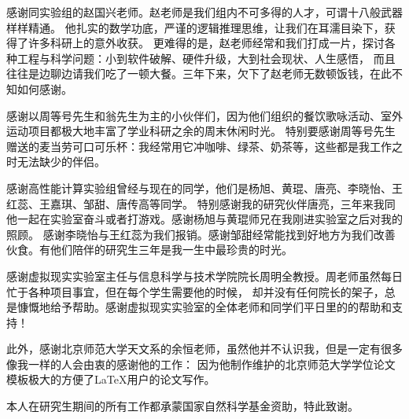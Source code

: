 \begin{ack}
感谢同实验组的赵国兴老师。赵老师是我们组内不可多得的人才，可谓十八般武器样样精通。 他扎实的数学功底，严谨的逻辑推理思维，让我们在耳濡目染下，获得了许多科研上的意外收获。 更难得的是，赵老师经常和我们打成一片，探讨各种工程与科学问题：小到软件破解、硬件升级，大到社会现状、人生感悟， 而且往往是边聊边请我们吃了一顿大餐。三年下来，欠下了赵老师无数顿饭钱，在此不知如何感谢。

感谢以周等号先生和翁先生为主的小伙伴们，因为他们组织的餐饮歌咏活动、室外运动项目都极大地丰富了学业科研之余的周末休闲时光。 特别要感谢周等号先生赠送的麦当劳可口可乐杯：我经常用它冲咖啡、绿茶、奶茶等，这些都是我工作之时无法缺少的伴侣。

感谢高性能计算实验组曾经与现在的同学，他们是杨旭、黄琨、唐亮、李晓怡、王红蕊、王嘉琪、邹甜、唐传高等同学。 特别感谢我的研究伙伴唐亮，三年来我同他一起在实验室奋斗或者打游戏。感谢杨旭与黄琨师兄在我刚进实验室之后对我的照顾。 感谢李晓怡与王红蕊为我们报销。感谢邹甜经常能找到好地方为我们改善伙食。有他们陪伴的研究生三年是我一生中最珍贵的时光。

感谢虚拟现实实验室主任与信息科学与技术学院院长周明全教授。周老师虽然每日忙于各种项目事宜，但在每个学生需要他的时候， 却并没有任何院长的架子，总是慷慨地给予帮助。感谢虚拟现实实验室的全体老师和同学们平日里的的帮助和支持！

此外，感谢北京师范大学天文系的余恒老师，虽然他并不认识我，但是一定有很多像我一样的人会由衷的感谢他的工作： 因为他制作维护的北京师范大学学位论文模板极大的方便了\LaTeX{}用户的论文写作。

本人在研究生期间的所有工作都承蒙国家自然科学基金资助，特此致谢。
\end{ack}
